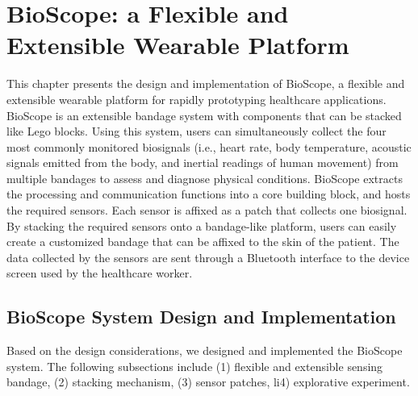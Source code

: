 \chapter{BioScope: a Flexible and Extensible Wearable Platform}
This chapter presents the design and implementation of BioScope, a flexible and extensible wearable platform for rapidly prototyping healthcare applications. BioScope is an extensible bandage system with components that can be stacked like Lego blocks. Using this system, users can simultaneously collect the four most commonly monitored biosignals (i.e., heart rate, body temperature, acoustic signals emitted from the body, and inertial readings of human movement) from multiple bandages to assess and diagnose physical conditions. BioScope extracts the processing and communication functions into a core building block, and hosts the required sensors. Each sensor is affixed as a patch that collects one biosignal. By stacking the required sensors onto a bandage-like platform, users can easily create a customized bandage that can be affixed to the skin of the patient. The data collected by the sensors are sent through a Bluetooth interface to the device screen used by the healthcare worker. 

\section{BioScope System Design and Implementation}
Based on the design considerations, we designed and implemented the BioScope system. The following subsections include (1) flexible and extensible sensing bandage, (2) stacking mechanism, (3) sensor patches, li4) explorative experiment.

